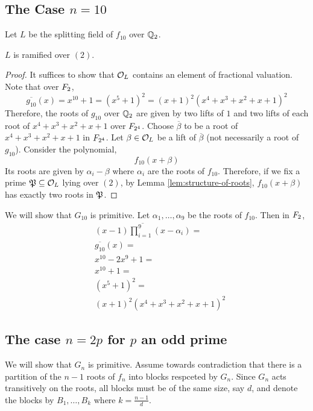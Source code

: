 \documentclass[../main.tex]{subfiles}
\begin{document}
\subsection{The Case $n = 10$}
Let $L$ be the splitting field of $f_{10}$ over $\Q_2$.
\begin{lemma}
  $L$ is ramified over $\left( 2 \right)$.
\end{lemma}
\begin{proof}

  It suffices to show that $\O_L$ contains an element of fractional valuation.
  Note that over $\F_2$,
  \[
    \overline{g_{10}}\left( x \right) = x^{10} + 1 = \left( x^5 + 1 \right)^2 = \left( x + 1 \right)^2 \left( x^4 + x^3 + x^2 + x + 1 \right)^2 
  \]
  Therefore, the roots of $g_{10}$ over $\Q_2$ are given by two lifts of $1$ and two lifts of each root of $x^4 + x^3 + x^2 + x + 1$ over $\F_{2^4}$.
  Choose $\overline{\beta}$ to be a root of $x^4 + x^3 + x^2 + x + 1$ in $\F_{2^4}$.
  Let $\beta \in \O_{L}$ be a lift of $\overline{\beta}$ (not necessarily a root of $g_{10}$).
  Consider the polynomial, 
  \[
    f_{10}\left( x + \beta \right)
  \]
  Its roots are given by $\alpha_i - \beta$ where $\alpha_i$ are the roots of $f_{10}$. 
  Therefore, if we fix a prime $\P \subseteq \O_L$ lying over $(2)$, by Lemma \ref{lem:structure-of-roots}, $f_{10}\left( x + \beta \right)$ has exactly two roots in $\P$.
\end{proof}

We will show that $G_{10}$ is primitive.
Let $\alpha_1, \ldots, \alpha_9$ be the roots of $f_{10}$.
Then in $\F_2$,
\begin{align*}
  & \overline{\left( x - 1 \right) \prod_{i=1}^{9} \left( x - \alpha_i \right)} = \\
  & \overline{g_{10}}\left( x \right) = \\
  & x^{10} - 2x^9 + 1 = \\
  & x^{10} + 1 = \\
  & \left( x^5 + 1 \right)^2 = \\
  & \left( x + 1 \right)^2 \left( x^4 + x^3 + x^2 + x + 1 \right)^2 
\end{align*}

\subsection{The case $n = 2p$ for $p$ an odd prime}

We will show that $G_n$ is primitive.
Assume towards contradiction that there is a partition of the $n - 1$ roots of $f_n$ into blocks respceted by $G_n$.
Since $G_n$ acts transitively on the roots, all blocks must be of the same size, say $d$, and denote the blocks by $B_1, \ldots, B_k$ where $k = \frac{ n - 1 }{ d }$.
\end{document}
